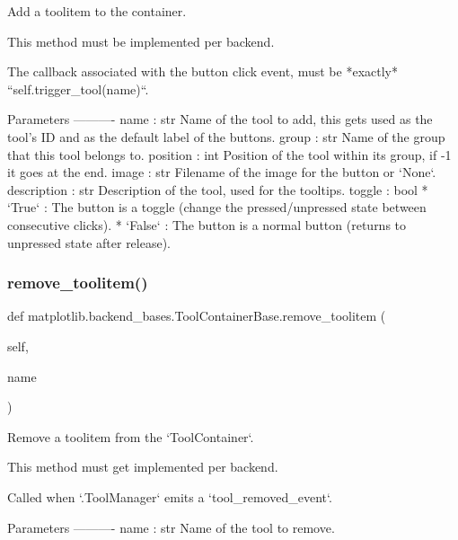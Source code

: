 \begin{DoxyVerb}Add a toolitem to the container.

This method must be implemented per backend.

The callback associated with the button click event,
must be *exactly* ``self.trigger_tool(name)``.

Parameters
----------
name : str
    Name of the tool to add, this gets used as the tool's ID and as the
    default label of the buttons.
group : str
    Name of the group that this tool belongs to.
position : int
    Position of the tool within its group, if -1 it goes at the end.
image : str
    Filename of the image for the button or `None`.
description : str
    Description of the tool, used for the tooltips.
toggle : bool
    * `True` : The button is a toggle (change the pressed/unpressed
      state between consecutive clicks).
    * `False` : The button is a normal button (returns to unpressed
      state after release).
\end{DoxyVerb}
 \mbox{\label{classmatplotlib_1_1backend__bases_1_1ToolContainerBase_a0cb9190bb61f0d767a38a29d93598b8f}} 
\subsubsection{\texorpdfstring{remove\+\_\+toolitem()}{remove\_toolitem()}}
{\footnotesize\ttfamily def matplotlib.\+backend\+\_\+bases.\+Tool\+Container\+Base.\+remove\+\_\+toolitem (\begin{DoxyParamCaption}\item[{}]{self,  }\item[{}]{name }\end{DoxyParamCaption})}

\begin{DoxyVerb}Remove a toolitem from the `ToolContainer`.

This method must get implemented per backend.

Called when `.ToolManager` emits a `tool_removed_event`.

Parameters
----------
name : str
    Name of the tool to remove.
\end{DoxyVerb}
 \mbox{\label{classmatplotlib_1_1backend__bases_1_1ToolContainerBase_aac3656e54a106ba6583f11fbaf1d2250}} 
